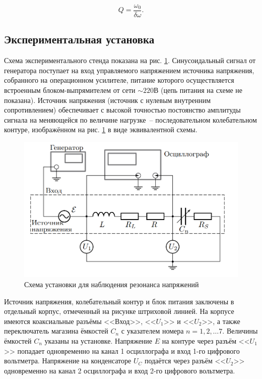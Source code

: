 \documentclass[a4paper,12pt]{article} %
\begin{document}
\begin{equation}\label{eq:Q2}
    Q = \frac{\omega_0}{\delta\omega}.
\end{equation}

\subsection{Экспериментальная установка}

Схема экспериментального стенда показана на рис. \ref{fig:setup}. Синусоидальный сигнал от генератора поступает на вход управляемого напряжением источника напряжения, собранного на операционном усилителе, питание которого осуществляется встроенным блоком-выпрямителем от сети $\sim 220 В$ (цепь питания на схеме не показана). Источник напряжения (источник с нулевым внутренним сопротивлением) обеспечивает с высокой точностью постоянство амплитуды сигнала на меняющейся по величине нагрузке~-- последовательном колебательном контуре, изображённом на рис. \ref{fig:setup} в виде эквивалентной схемы.

\begin{figure}[h]
    \centering
    \includegraphics[scale=0.8]{setup.png}
    \caption{Схема установки для наблюдения резонанса напряжений}
    \label{fig:setup}
\end{figure}

Источник напряжения, колебательный контур и блок питания заключены в отдельный корпус, отмеченный на рисунке штриховой линией. На корпусе имеются коаксиальные разъёмы <<Вход>>, <<$U_1$>> и <<$U_2$>>, а также переключатель магазина ёмкостей $C_n$ с указателем номера $n = 1, 2,\dots 7$. Величины ёмкостей $C_n$ указаны на установке. Напряжение $E$ на контуре через разъём <<$U_1$>> попадает одновременно на канал 1 осциллографа и вход 1-го цифрового вольтметра. Напряжение на
конденсаторе $U_C$ подаётся через разъём <<$U_2$>> одновременно на канал 2
осциллографа и вход 2-го цифрового вольтметра.
\end{document}
